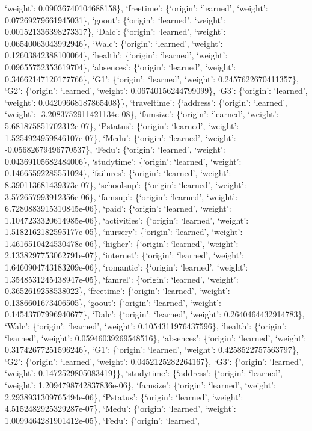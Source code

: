 \documentclass[
]{article}
\begin{document}
`weight': 0.09036740104688158\}, `freetime': \{`origin': `learned',
`weight': 0.07269279661945031\}, `goout': \{`origin': `learned',
`weight': 0.001521336398273317\}, `Dalc': \{`origin': `learned',
`weight': 0.06540063043992946\}, `Walc': \{`origin': `learned',
`weight': 0.12603842388100064\}, `health': \{`origin': `learned',
`weight': 0.09655752353619704\}, `absences': \{`origin': `learned',
`weight': 0.34662147120177766\}, `G1': \{`origin': `learned', `weight':
0.2457622670411357\}, `G2': \{`origin': `learned', `weight':
0.06740156244799099\}, `G3': \{`origin': `learned', `weight':
0.04209668187865408\}\}, `traveltime': \{`address': \{`origin':
`learned', `weight': -3.2083752911421134e-08\}, `famsize': \{`origin':
`learned', `weight': 5.681875851702312e-07\}, `Pstatus': \{`origin':
`learned', `weight': 1.5254924959846107e-07\}, `Medu': \{`origin':
`learned', `weight': -0.05682679496770537\}, `Fedu': \{`origin':
`learned', `weight': 0.04369105682484006\}, `studytime': \{`origin':
`learned', `weight': 0.14665592285551024\}, `failures': \{`origin':
`learned', `weight': 8.390113681439373e-07\}, `schoolsup': \{`origin':
`learned', `weight': 3.572657993912356e-06\}, `famsup': \{`origin':
`learned', `weight': 6.7280883915310845e-06\}, `paid': \{`origin':
`learned', `weight': 1.1047233320614985e-06\}, `activities': \{`origin':
`learned', `weight': 1.5182162182595177e-05\}, `nursery': \{`origin':
`learned', `weight': 1.4616510424530478e-06\}, `higher': \{`origin':
`learned', `weight': 2.1338297753062791e-07\}, `internet': \{`origin':
`learned', `weight': 1.6460904743183209e-06\}, `romantic': \{`origin':
`learned', `weight': 1.3548531245438947e-05\}, `famrel': \{`origin':
`learned', `weight': 0.3652619258538022\}, `freetime': \{`origin':
`learned', `weight': 0.1386601673406505\}, `goout': \{`origin':
`learned', `weight': 0.14543707996940677\}, `Dalc': \{`origin':
`learned', `weight': 0.2640464432914783\}, `Walc': \{`origin':
`learned', `weight': 0.1054311976437596\}, `health': \{`origin':
`learned', `weight': 0.05946039269548516\}, `absences': \{`origin':
`learned', `weight': 0.31742677251596246\}, `G1': \{`origin': `learned',
`weight': 0.4258522757563797\}, `G2': \{`origin': `learned', `weight':
0.0452125282264167\}, `G3': \{`origin': `learned', `weight':
0.1472529805083419\}\}, `studytime': \{`address': \{`origin': `learned',
`weight': 1.2094798742837836e-06\}, `famsize': \{`origin': `learned',
`weight': 2.2938931309765494e-06\}, `Pstatus': \{`origin': `learned',
`weight': 4.5152482925329287e-07\}, `Medu': \{`origin': `learned',
`weight': 1.0099464281901412e-05\}, `Fedu': \{`origin': `learned',
\end{document}
